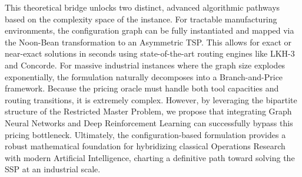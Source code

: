 \documentclass[12pt]{article}
\begin{document}
	This theoretical bridge unlocks two distinct, advanced algorithmic pathways based on the complexity space of the instance. For tractable manufacturing environments, the configuration graph can be fully instantiated and mapped via the Noon-Bean transformation to an Asymmetric TSP. This allows for exact or near-exact solutions in seconds using state-of-the-art routing engines like LKH-3 and Concorde. For massive industrial instances where the graph size explodes exponentially, the formulation naturally decomposes into a Branch-and-Price framework. Because the pricing oracle must handle both tool capacities and routing transitions, it is extremely complex. However, by leveraging the bipartite structure of the Restricted Master Problem, we propose that integrating Graph Neural Networks and Deep Reinforcement Learning can successfully bypass this pricing bottleneck. Ultimately, the configuration-based formulation provides a robust mathematical foundation for hybridizing classical Operations Research with modern Artificial Intelligence, charting a definitive path toward solving the SSP at an industrial scale.
	
	\printbibliography
	
\end{document}

